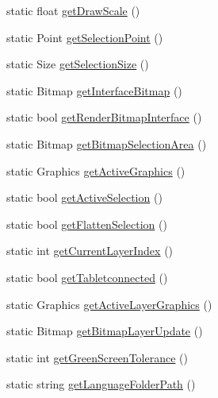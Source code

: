 \begin{DoxyCompactItemize}
static float \mbox{\hyperlink{class_paint___program_1_1_shared_settings_a65fab5275ab2f03d59c82d9d89a49259}{get\+Draw\+Scale}} ()
\item 
static Point \mbox{\hyperlink{class_paint___program_1_1_shared_settings_a1f375368183a92fafd46ab3ebfe190ca}{get\+Selection\+Point}} ()
\item 
static Size \mbox{\hyperlink{class_paint___program_1_1_shared_settings_a3a70e02e9767a6f382749be59a3598f8}{get\+Selection\+Size}} ()
\item 
static Bitmap \mbox{\hyperlink{class_paint___program_1_1_shared_settings_a9be1340df9ec7d2273677843a420392a}{get\+Interface\+Bitmap}} ()
\item 
static bool \mbox{\hyperlink{class_paint___program_1_1_shared_settings_a8be048107e101c8356b06ebc5f9df2f2}{get\+Render\+Bitmap\+Interface}} ()
\item 
static Bitmap \mbox{\hyperlink{class_paint___program_1_1_shared_settings_a89bc99f8663c4aa294aec17c2285ecc1}{get\+Bitmap\+Selection\+Area}} ()
\item 
static Graphics \mbox{\hyperlink{class_paint___program_1_1_shared_settings_a3651f001da852d83e39fa163e402a42a}{get\+Active\+Graphics}} ()
\item 
static bool \mbox{\hyperlink{class_paint___program_1_1_shared_settings_a828b2e99b175c2e8046488bb528344ae}{get\+Active\+Selection}} ()
\item 
static bool \mbox{\hyperlink{class_paint___program_1_1_shared_settings_ac6481b1ba367128d804b73faf4aa5dbd}{get\+Flatten\+Selection}} ()
\item 
static int \mbox{\hyperlink{class_paint___program_1_1_shared_settings_af4e10c7ba43ee283d249fceb8d48be84}{get\+Current\+Layer\+Index}} ()
\item 
static bool \mbox{\hyperlink{class_paint___program_1_1_shared_settings_a8be305e87d1ad6f51c597752aeea55cf}{get\+Tabletconnected}} ()
\item 
static Graphics \mbox{\hyperlink{class_paint___program_1_1_shared_settings_ac0f109cbcdf15cbfc5b2b15f6c9d656c}{get\+Active\+Layer\+Graphics}} ()
\item 
static Bitmap \mbox{\hyperlink{class_paint___program_1_1_shared_settings_ad768b5bef3d529750ca2d517a039b185}{get\+Bitmap\+Layer\+Update}} ()
\item 
static int \mbox{\hyperlink{class_paint___program_1_1_shared_settings_afaeebf492f6e800a70991011aca4a88a}{get\+Green\+Screen\+Tolerance}} ()
\item 
static string \mbox{\hyperlink{class_paint___program_1_1_shared_settings_ac279ac05c99005af47c80bda0e70fd37}{get\+Language\+Folder\+Path}} ()

\end{DoxyCompactItemize}
